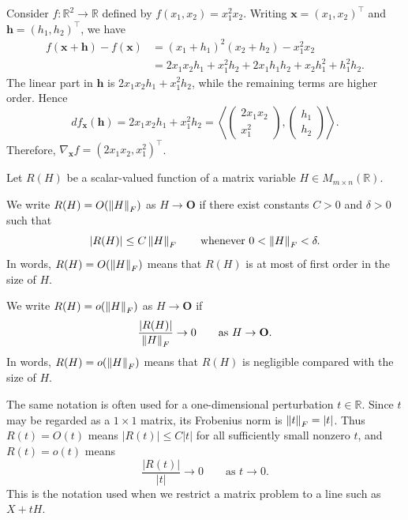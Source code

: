 \begin{example}
Consider $f:\mathbb{R}^2\to\mathbb{R}$ defined by $f(x_1,x_2)=x_1^2x_2$.
Writing $\mathbf{x}=(x_1,x_2)^{\top}$ and $\mathbf{h}=(h_1,h_2)^{\top}$, we have
\[
\begin{aligned}
    f(\mathbf{x}+\mathbf{h})-f(\mathbf{x})
    &=
    (x_1+h_1)^2(x_2+h_2)-x_1^2x_2 \\
    &=
    2x_1x_2h_1+x_1^2h_2
    +2x_1h_1h_2+x_2h_1^2+h_1^2h_2.
\end{aligned}
\]
The linear part in $\mathbf{h}$ is $2x_1x_2h_1+x_1^2h_2$, while the remaining terms are higher order. Hence
\[
    df_{\mathbf{x}}(\mathbf{h})
    =
    2x_1x_2h_1+x_1^2h_2
    =
    \left\langle
    \begin{pmatrix}
        2x_1x_2\\
        x_1^2
    \end{pmatrix},
    \begin{pmatrix}
        h_1\\
        h_2
    \end{pmatrix}
    \right\rangle.
\]
Therefore, $\nabla_{\mathbf{x}} f = (2x_1x_2, x_1^2)^{\top}$.
\end{example}

\begin{definition}
Let $R(H)$ be a scalar-valued function of a matrix variable
$H\in M_{m\times n}(\mathbb{R})$.

We write $R(H)=O(\left\lVert H \right\rVert_F)$ as $H\to \mathbf O$ if there exist constants
$C>0$ and $\delta>0$ such that
\[
    |R(H)|
    \le
    C\left\lVert H \right\rVert_F
    \qquad
    \text{whenever }0<\left\lVert H \right\rVert_F<\delta.
\]
In words, $R(H)=O(\left\lVert H \right\rVert_F)$ means that $R(H)$ is at most of first order in
the size of $H$.

We write $R(H)=o(\left\lVert H \right\rVert_F)$ as $H\to \mathbf O$ if
\[
    \frac{|R(H)|}{\left\lVert H \right\rVert_F}
    \to
    0
    \qquad
    \text{as }H\to \mathbf O.
\]
In words, $R(H)=o(\left\lVert H \right\rVert_F)$ means that $R(H)$ is negligible compared with
the size of $H$.
\end{definition}

\begin{remark}
The same notation is often used for a one-dimensional perturbation $t\in
\mathbb{R}$. Since $t$ may be regarded as a $1\times1$ matrix, its Frobenius
norm is $\left\lVert t \right\rVert_F=|t|$. Thus $R(t)=O(t)$ means $|R(t)|\le C|t|$ for all
sufficiently small nonzero $t$, and $R(t)=o(t)$ means
\[
    \frac{|R(t)|}{|t|}\to0
    \qquad
    \text{as }t\to0.
\]
This is the notation used when we restrict a matrix problem to a line such as
$X+tH$.
\end{remark}

